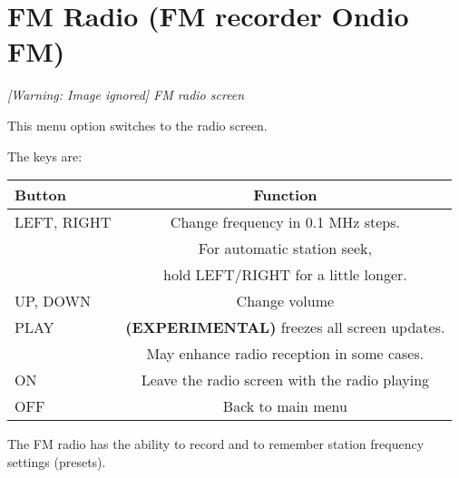 \section{\label{ref:FMradio}FM Radio (FM recorder Ondio FM)}
{\centering\itshape
  [Warning: Image ignored] %
 \newline
FM radio screen
\par}

This menu option switches to the radio screen. 

The keys are:

\begin{table}[h!]
  \begin{center}
    \begin{tabular}{@{}lc@{}}\toprule
      \textbf{Button} & \textbf{Function} \\\midrule
      LEFT, RIGHT & Change frequency in 0.1 MHz steps. \\
                  & For automatic station seek, \\
                  & hold LEFT/RIGHT for a little longer. \\
      UP, DOWN & Change volume \\
      PLAY & \textbf{(EXPERIMENTAL)} freezes all screen updates.\\
           & May enhance radio reception in some cases. \\
      ON & Leave the radio screen with the radio playing \\
      OFF & Back to main menu \\\bottomrule
    \end{tabular}
  \end{center}
\end{table}
The FM radio has the ability to record and to remember station frequency
settings (presets).


